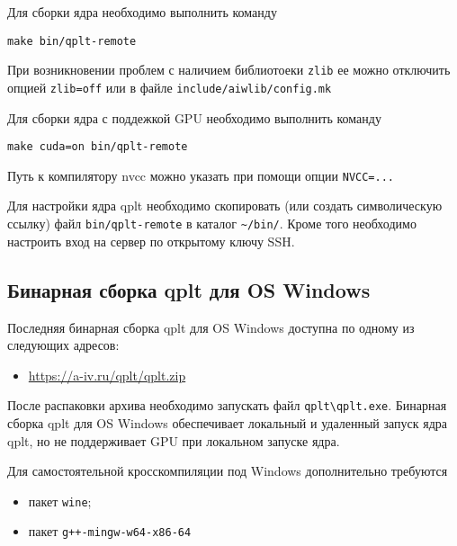 \documentclass[12pt]{article}
\begin{document}
Для сборки ядра необходимо выполнить команду
\begin{verbatim}
make bin/qplt-remote
\end{verbatim}
При возникновении проблем с наличием библиотоеки \verb'zlib' ее можно отключить опцией \verb'zlib=off'
или в файле \verb'include/aiwlib/config.mk'

Для сборки ядра с поддежкой GPU необходимо выполнить команду
\begin{verbatim}
make cuda=on bin/qplt-remote
\end{verbatim}
Путь к компилятору nvcc можно указать при помощи опции \verb'NVCC=...'

Для настройки ядра qplt необходимо скопировать (или создать символическую ссылку) файл \verb'bin/qplt-remote' в каталог \verb'~/bin/'.
Кроме того необходимо настроить вход на сервер по открытому ключу SSH.


\subsection{Бинарная сборка qplt для OS Windows}
Последняя бинарная сборка qplt для OS  Windows доступна по одному из следующих адресов:
\begin{itemize}
\item \href{http://a-iv.ru/qplt/qplt.zip}{https://a-iv.ru/qplt/qplt.zip}
\end{itemize}
После распаковки архива необходимо запускать файл \verb'qplt\qplt.exe'.
Бинарная сборка qplt для OS  Windows обеспечивает локальный и удаленный запуск ядра qplt, но не поддерживает GPU при локальном запуске ядра.

Для самостоятельной кросскомпиляции под Windows дополнительно требуются
\begin{itemize}
\item пакет \verb'wine';
\item пакет \verb'g++-mingw-w64-x86-64'
\end{itemize}
\end{document}
